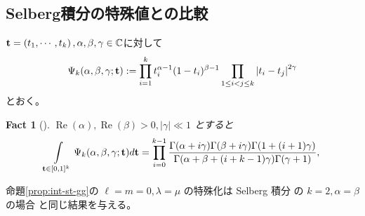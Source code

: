 \documentclass[12pt,a4paper,dvipdfmx]{jsarticle}
\numberwithin{equation}{section}
\newcommand{\tmop}[1]{\ensuremath{\operatorname{#1}}}
\newcommand{\assign}{:=}
\theoremstyle{jplain}
\newtheorem{fact}[thm]{Fact}
\theoremstyle{remark}
\theoremstyle{definition}
\begin{document}
\subsection{Selberg積分の特殊値との比較}
\newcommand{\boldt}{\mathbf{t}}
$\boldt=\left( t_1,\cdots,t_k \right),\alpha,\beta,\gamma\in\C$に対して\begin{equation*}
	\Psi_k(\alpha,\beta,\gamma;\mathbf{t})\assign
\displaystyle\prod\displaylimits_{i=1}^k t_i^{\alpha-1}(1-t_i)^{\beta-1} 
		\displaystyle\prod\displaylimits_{1\le i<j\le k}\myabs{t_i-t_j}^{2\gamma}
\end{equation*}とおく。
		\normalfont
		\begin{fact}[{\cite[セルバーグ積分]{Selberg:411367}}]
				$\tmop{Re} (\alpha), \tmop{Re} (\beta) > 0, | \gamma | \ll 1$
				とすると
	 \begin{equation*}
		 \normalfont
		\begin{array}[]{c}
		\displaystyle\int_{\boldt \in [0, 1]^k}  \Psi_k(\alpha,\beta,\gamma;\boldt)d\boldt=
		\displaystyle\prod_{i = 0}^{k - 1} \frac{\Gamma (\alpha + i \gamma) \Gamma (\beta + i
				\gamma) \Gamma (1 + (i + 1) \gamma)}{\Gamma (\alpha + \beta + (i + k - 1)
				\gamma) \Gamma (\gamma + 1)},
		\end{array}
			\end{equation*}
		\end{fact}
		命題\ref{prop:int-st-gg}の $\ell = m = 0,\lambda=\mu$ の特殊化は
		Selberg 積分
の $k = 2,\alpha=\beta$ の場合
と同じ結果を与える。
\\
			\begin{samepage}
				\vspace{1em}
		\centerline{
		\xymatrixcolsep{1.9cm}
		}
		\nopagebreak
				\vspace{1em}
			\end{samepage}
\end{document}
